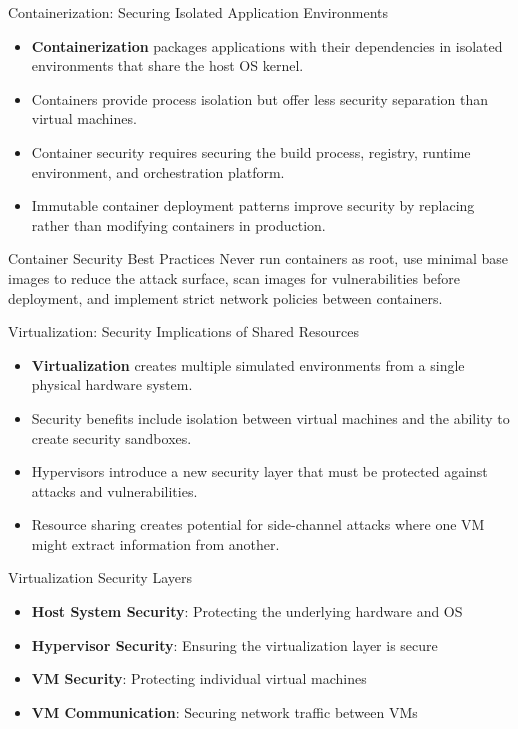 \documentclass{beamer}
\begin{document}
            \begin{frame}{Containerization: Securing Isolated Application Environments}
            \begin{itemize}
            \item \textbf{Containerization} packages applications with their dependencies in isolated environments that share the host OS kernel.
            \item Containers provide process isolation but offer less security separation than virtual machines.
            \item Container security requires securing the build process, registry, runtime environment, and orchestration platform.
            \item Immutable container deployment patterns improve security by replacing rather than modifying containers in production.
            \end{itemize}
            
            \begin{alertblock}{Container Security Best Practices}
            Never run containers as root, use minimal base images to reduce the attack surface, scan images for vulnerabilities before deployment, and implement strict network policies between containers.
            \end{alertblock}
            \end{frame}

    \begin{frame}{Virtualization: Security Implications of Shared Resources}
        \begin{itemize}
        \item \textbf{Virtualization} creates multiple simulated environments from a single physical hardware system.
        \item Security benefits include isolation between virtual machines and the ability to create security sandboxes.
        \item Hypervisors introduce a new security layer that must be protected against attacks and vulnerabilities.
        \item Resource sharing creates potential for side-channel attacks where one VM might extract information from another.
        \end{itemize}
        
        \begin{block}{Virtualization Security Layers}
        \begin{itemize}
        \item \textbf{Host System Security}: Protecting the underlying hardware and OS
        \item \textbf{Hypervisor Security}: Ensuring the virtualization layer is secure
        \item \textbf{VM Security}: Protecting individual virtual machines
        \item \textbf{VM Communication}: Securing network traffic between VMs
        \end{itemize}
        \end{block}
        \end{frame}
        
\end{document}
